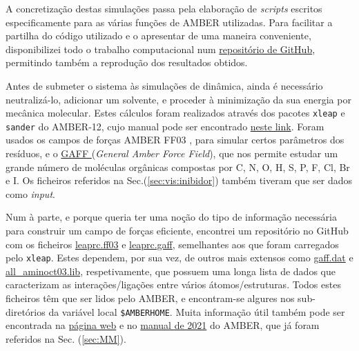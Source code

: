 \documentclass[12pt,a4paper]{article}
\begin{document}
	A concretização destas simulações passa pela elaboração de \textit{scripts} escritos especificamente para as várias funções de AMBER utilizadas. Para facilitar a partilha do código utilizado e o apresentar de uma maneira conveniente, disponibilizei todo o trabalho computacional num \href{https://github.com/cesarium/biochem-report}{repositório de GitHub}, permitindo também a reprodução dos resultados obtidos.
	
	Antes de submeter o sistema às simulações de dinâmica, ainda é necessário neutralizá-lo, adicionar um solvente, e proceder à minimização da sua energia por mecânica molecular. Estes cálculos foram realizados através dos pacotes \verb|xleap| e \verb|sander| do AMBER-12, cujo manual pode ser encontrado \href{https://ambermd.org/doc12/Amber12.pdf}{neste link}. Foram usados os campos de forças AMBER FF03 \cite{duanPointchargeForceField2003,zhangWellbalancedForceField2019}, para simular certos parâmetros dos resíduos, e o \href{https://ambermd.org/antechamber/gaff.html}{GAFF } (\textit{General Amber Force Field}), que nos permite estudar um grande número de moléculas orgânicas compostas por C, N, O, H, S, P, F, Cl, Br e I. Os ficheiros referidos na Sec.(\ref{sec:vis:inibidor}) também tiveram que ser dados como \textit{input}.
	
	Num à parte, e porque queria ter uma noção do tipo de informação necessária para construir um campo de forças eficiente, encontrei um repositório no GitHub com os ficheiros \href{https://github.com/choderalab/ambermini/blob/master/share/amber/dat/leap/cmd/oldff/leaprc.ff03}{leaprc.ff03} e \href{https://github.com/choderalab/ambermini/blob/master/share/amber/dat/leap/cmd/leaprc.gaff}{leaprc.gaff}, semelhantes aos que foram carregados pelo \verb|xleap|. Estes dependem, por sua vez, de outros mais extensos como \href{https://github.com/choderalab/ambermini/blob/master/share/amber/dat/leap/parm/gaff.dat}{gaff.dat} e \href{https://github.com/choderalab/ambermini/blob/master/share/amber/dat/leap/lib/all_aminoct03.lib}{all\_aminoct03.lib}, respetivamente, que possuem uma longa lista de dados que caracterizam as interações/ligações entre vários átomos/estruturas. Todos estes ficheiros têm que ser lidos pelo AMBER, e encontram-se algures nos sub-diretórios da variável local \verb|$AMBERHOME|. Muita informação útil também pode ser encontrada na \href{https://ambermd.org/AmberModels.php}{página web} e no \href{https://ambermd.org/doc12/Amber21.pdf#page=264}{manual de 2021} do AMBER, que já foram referidos na Sec. (\ref{sec:MM}).
	
\end{document}
